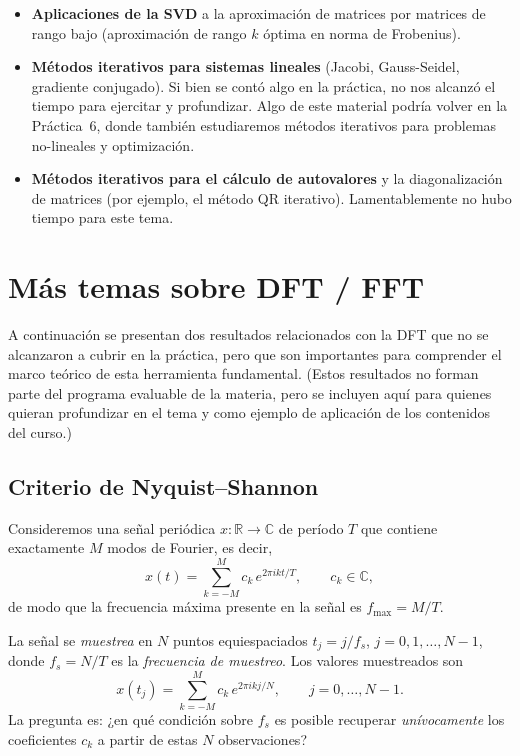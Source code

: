 \documentclass[12pt]{article}
\newcommand{\R}{\mathbb{R}}
\newcommand{\C}{\mathbb{C}}
\begin{document}
\begin{itemize}
  \item \textbf{Aplicaciones de la SVD} a la aproximación de matrices por matrices de rango bajo (aproximación de rango $k$ óptima en norma de Frobenius).
  \item \textbf{Métodos iterativos para sistemas lineales} (Jacobi, Gauss-Seidel, gradiente conjugado). Si bien se contó algo en la práctica, no nos alcanzó el tiempo para ejercitar y profundizar. Algo de este material podría volver en la Práctica~6, donde también estudiaremos métodos iterativos para problemas no-lineales y optimización.
  \item \textbf{Métodos iterativos para el cálculo de autovalores} y la diagonalización de matrices (por ejemplo, el método QR iterativo). Lamentablemente no hubo tiempo para este tema.
\end{itemize}

\section*{Más temas sobre DFT / FFT}

A continuación se presentan dos resultados relacionados con la DFT que no se alcanzaron a cubrir en la práctica, pero que son importantes para comprender el marco teórico de esta herramienta fundamental. (Estos resultados no forman parte del programa evaluable de la materia, pero se incluyen aquí para quienes quieran profundizar en el tema y como ejemplo de aplicación de los contenidos del curso.)

\subsection*{Criterio de Nyquist--Shannon}

Consideremos una señal periódica $x : \R \to \C$ de período $T$ que contiene exactamente $M$ modos de Fourier, es decir,
\[
  x(t) = \sum_{k=-M}^{M} c_k\, e^{2\pi i k t / T}, \qquad c_k \in \C,
\]
de modo que la frecuencia máxima presente en la señal es $f_{\max} = M/T$.

La señal se \emph{muestrea} en $N$ puntos equiespaciados $t_j = j/f_s$, $j = 0, 1, \ldots, N-1$, donde $f_s = N/T$ es la \emph{frecuencia de muestreo}. Los valores muestreados son
\[
  x(t_j) = \sum_{k=-M}^{M} c_k\, e^{2\pi i k j / N}, \qquad j = 0, \ldots, N-1.
\]
La pregunta es: ¿en qué condición sobre $f_s$ es posible recuperar \emph{unívocamente} los coeficientes $c_k$ a partir de estas $N$ observaciones?
\end{document}
